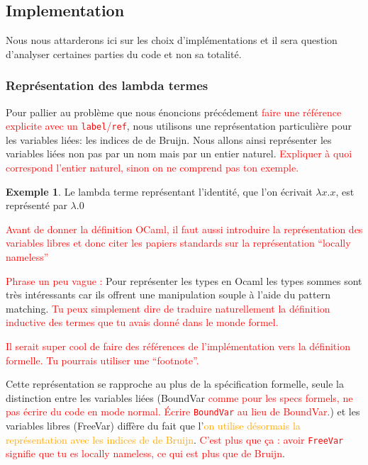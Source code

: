 \documentclass {article}
\newcommand{\codefrom}[3]
           {}
\theoremstyle{definition}
\newtheorem{example}{Exemple}
\theoremstyle{remark}
\newcommand{\todo}[1]{\textcolor{red}{#1}}
\newcommand{\attention}[1]{\textcolor{orange}{#1}}
\begin{document}
\subsection{Implementation}

Nous nous attarderons ici sur les choix d'implémentations et il sera question
d'analyser certaines parties du code et non sa totalité.

\subsubsection{Représentation des lambda termes}
 
Pour pallier au problème que nous énoncions précédement \todo{faire
  une référence explicite avec un \verb!label!/\verb!ref!}, nous
utilisons une représentation particulière pour les variables liées:
les indices de de Bruijn.  Nous allons ainsi représenter les variables
liées non pas par un nom mais par un entier naturel. \todo{Expliquer à
  quoi correspond l'entier naturel, sinon on ne comprend pas ton
  exemple.}

\begin{example}
  Le lambda terme représentant l'identité, que l'on écrivait \(\lambda x.x\), est représenté par \(\lambda.0\)
\end{example}

\todo{Avant de donner la définition OCaml, il faut aussi introduire la
  représentation des variables libres et donc citer les papiers
  standards sur la représentation ``locally nameless''}

\todo{Phrase un peu vague :} Pour représenter les types en Ocaml les
types sommes sont très intéressants car ils offrent une manipulation
souple à l'aide du pattern matching. \todo{Tu peux simplement dire de
  traduire naturellement la définition inductive des termes que tu
  avais donné dans le monde formel.}

\codefrom{untyped}{lambda}{untyped_term}

\todo{Il serait super cool de faire des références de l'implémentation
  vers la définition formelle. Tu pourrais utiliser une ``footnote''.}

Cette représentation se rapproche au plus de la spécification
formelle, seule la distinction entre les variables liées (BoundVar
\todo{comme pour les specs formels, ne pas écrire du code en mode
  normal. Écrire \lstinline!BoundVar! au lieu de BoundVar.}) et les
variables libres (FreeVar) diffère du fait que l'\attention{on utilise
  désormais la représentation avec les indices de de
  Bruijn}. \todo{C'est plus que ça : avoir \lstinline!FreeVar!
  signifie que tu es locally nameless, ce qui est plus que de Bruijn}.
\end{document}
